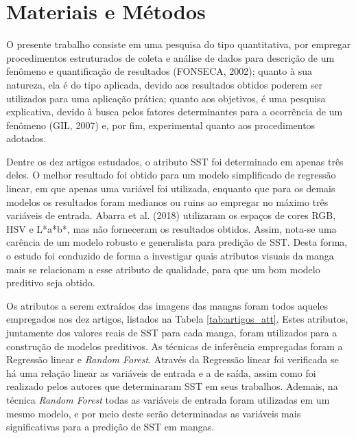 \chapter{Materiais e Métodos} \label{ch:MM} %

O presente trabalho consiste em uma pesquisa do tipo quantitativa, por empregar procedimentos estruturados de coleta e análise de dados para descrição de um fenômeno e quantificação de resultados (FONSECA, 2002); quanto à sua natureza, ela é do tipo aplicada, devido aos resultados obtidos poderem ser utilizados para uma aplicação prática; quanto aos objetivos, é uma pesquisa explicativa, devido à busca pelos fatores determinantes para a ocorrência de um fenômeno (GIL, 2007) e, por fim, experimental quanto aos procedimentos adotados. 

Dentre os dez artigos estudados, o atributo SST foi determinado em apenas três deles. O melhor resultado foi obtido para um modelo simplificado de regressão linear, em que apenas uma variável foi utilizada, enquanto que para os demais modelos os resultados foram medianos ou ruins ao empregar no máximo três variáveis de entrada. Abarra et al. (2018) utilizaram os espaços de cores RGB, HSV e L*a*b*, mas não forneceram os resultados obtidos. Assim, nota-se uma carência de um modelo robusto e generalista para predição de SST. Desta forma, o estudo foi conduzido de forma a investigar quais atributos visuais da manga mais se relacionam a esse atributo de qualidade, para que um bom modelo preditivo seja obtido.

Os atributos a serem extraídos das imagens das mangas foram todos aqueles empregados nos dez artigos, listados na Tabela \ref{tab:artigos_att}. Estes atributos, juntamente dos valores reais de SST para cada manga, foram utilizados para a construção de modelos preditivos. As técnicas de inferência empregadas foram a Regressão linear e \textit{Random Forest}. Através da Regressão linear foi verificada se há uma relação linear as variáveis de entrada e a de saída, assim como foi realizado pelos autores que determinaram SST em seus trabalhos. Ademais, na técnica \textit{Random Forest} todas as variáveis de entrada foram utilizadas em um mesmo modelo, e por meio deste serão determinadas as variáveis mais significativas para a predição de SST em mangas. 

